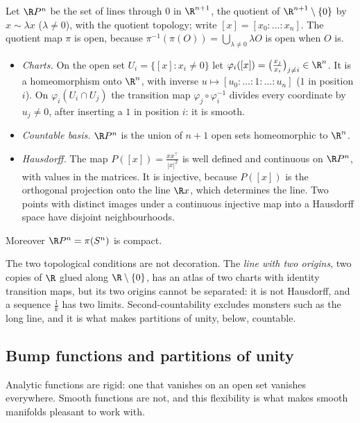 \begin{example}\label{ex:rpn}
Let $\R P^n$ be the set of lines through $0$ in $\R^{n+1}$, the quotient of $\R^{n+1}\setminus\{0\}$ by $x\sim\lambda x$ ($\lambda\ne0$), with the quotient
topology; write $[x]=[x_0:\dots:x_n]$. The quotient map $\pi$ is open, because $\pi^{-1}(\pi(O))=\bigcup_{\lambda\ne0}\lambda O$ is open when $O$ is.
\begin{itemize}
\item \emph{Charts.} On the open set $U_i=\{[x]:x_i\ne0\}$ let $\varphi_i([x])=\bigl(\frac{x_j}{x_i}\bigr)_{j\ne i}\in\R^n$. It is a homeomorphism onto
$\R^n$, with inverse $u\mapsto[u_0:\dots:1:\dots:u_n]$ ($1$ in position $i$). On $\varphi_i(U_i\cap U_j)$ the transition map $\varphi_j\circ\varphi_i^{-1}$
divides every coordinate by $u_j\ne0$, after inserting a $1$ in position $i$: it is smooth.
\item \emph{Countable basis.} $\R P^n$ is the union of $n+1$ open sets homeomorphic to $\R^n$.
\item \emph{Hausdorff.} The map $P([x])=\frac{xx^\top}{|x|^2}$ is well defined and continuous on $\R P^n$, with values in the matrices. It is injective,
because $P([x])$ is the orthogonal projection onto the line $\R x$, which determines the line. Two points with distinct images under a continuous
injective map into a Hausdorff space have disjoint neighbourhoods.
\end{itemize}
Moreover $\R P^n=\pi(S^n)$ is compact.
\end{example}

\begin{remark}
The two topological conditions are not decoration. The \emph{line with two origins}, two copies of $\R$ glued along $\R\setminus\{0\}$, has an atlas of two
charts with identity transition maps, but its two origins cannot be separated: it is not Hausdorff, and a sequence $\frac1k$ has two limits.
Second-countability excludes monsters such as the long line, and it is what makes partitions of unity, below, countable.
\end{remark}

\subsection*{Bump functions and partitions of unity}

Analytic functions are rigid: one that vanishes on an open set vanishes everywhere. Smooth functions are not, and this flexibility is what makes smooth
manifolds pleasant to work with.

